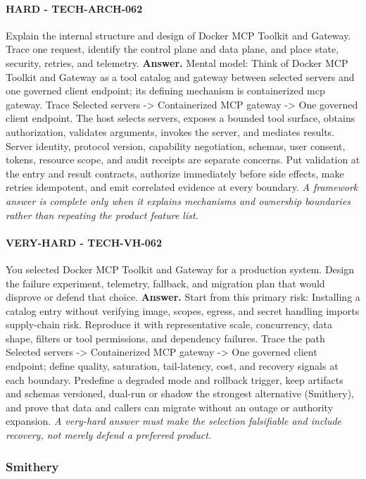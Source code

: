 \paragraph{HARD - TECH-ARCH-062} Explain the internal structure and design of Docker MCP Toolkit and Gateway. Trace one request, identify the control plane and data plane, and place state, security, retries, and telemetry.
\textbf{Answer.} Mental model: Think of Docker MCP Toolkit and Gateway as a tool catalog and gateway between selected servers and one governed client endpoint; its defining mechanism is containerized mcp gateway. Trace Selected servers -> Containerized MCP gateway -> One governed client endpoint. The host selects servers, exposes a bounded tool surface, obtains authorization, validates arguments, invokes the server, and mediates results. Server identity, protocol version, capability negotiation, schemas, user consent, tokens, resource scope, and audit receipts are separate concerns. Put validation at the entry and result contracts, authorize immediately before side effects, make retries idempotent, and emit correlated evidence at every boundary.
\textit{A framework answer is complete only when it explains mechanisms and ownership boundaries rather than repeating the product feature list.}
\paragraph{VERY-HARD - TECH-VH-062} You selected Docker MCP Toolkit and Gateway for a production system. Design the failure experiment, telemetry, fallback, and migration plan that would disprove or defend that choice.
\textbf{Answer.} Start from this primary risk: Installing a catalog entry without verifying image, scopes, egress, and secret handling imports supply-chain risk. Reproduce it with representative scale, concurrency, data shape, filters or tool permissions, and dependency failures. Trace the path Selected servers -> Containerized MCP gateway -> One governed client endpoint; define quality, saturation, tail-latency, cost, and recovery signals at each boundary. Predefine a degraded mode and rollback trigger, keep artifacts and schemas versioned, dual-run or shadow the strongest alternative (Smithery), and prove that data and callers can migrate without an outage or authority expansion.
\textit{A very-hard answer must make the selection falsifiable and include recovery, not merely defend a preferred product.}
\subsubsection*{Smithery}
